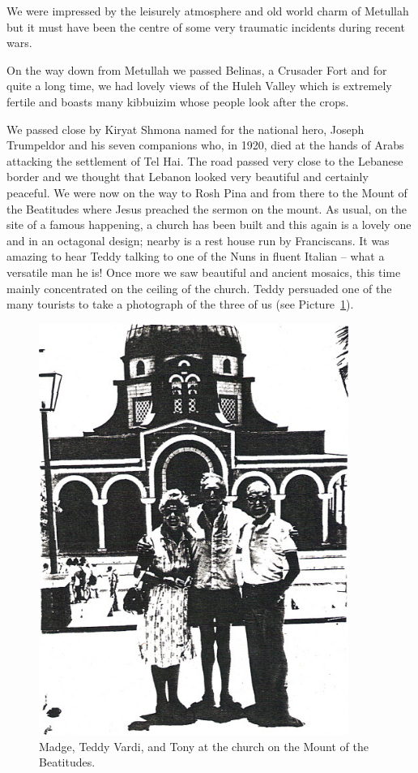 We were impressed by the leisurely atmosphere and old world charm of
Metullah but it must have been the centre of some very traumatic
incidents during recent wars.

On the way down from Metullah we passed Belinas, a Crusader Fort and
for quite a long time, we had lovely views of the Huleh Valley which
is extremely fertile and boasts many kibbuizim whose people look after
the crops.

We passed close by Kiryat Shmona named for the national hero, Joseph
Trumpeldor and his seven companions who, in 1920, died at the hands of
Arabs attacking the settlement of Tel Hai. The road passed very close
to the Lebanese border and we thought that Lebanon looked very
beautiful and certainly peaceful. We were now on the way to Rosh Pina
and from there to the Mount of the Beatitudes where Jesus preached the
sermon on the mount. As usual, on the site of a famous happening, a
church has been built and this again is a lovely one and in an
octagonal design; nearby is a rest house run by Franciscans. It was
amazing to hear Teddy talking to one of the Nuns in fluent Italian --
what a versatile man he is! Once more we saw beautiful and ancient
mosaics, this time mainly concentrated on the ceiling of the
church. Teddy persuaded one of the many tourists to take a photograph
of the three of us (see Picture~\ref{israel3}).

\begin{figure}
  \centering
  \includegraphics[width=0.9\textwidth]{photos/israel3}
  \caption{Madge, Teddy Vardi, and Tony at the church on the Mount of
    the Beatitudes.}
  \label{israel3}
\end{figure}

